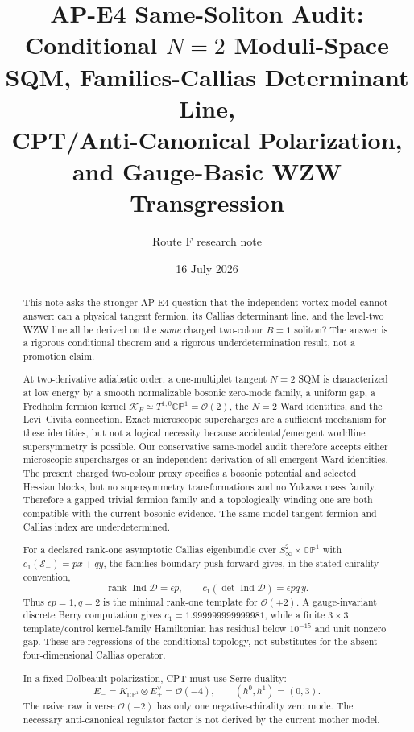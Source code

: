 \documentclass[11pt]{article}
\title{AP-E4 Same-Soliton Audit:\\
Conditional \(N=2\) Moduli-Space SQM, Families-Callias Determinant Line,\\
CPT/Anti-Canonical Polarization, and Gauge-Basic WZW Transgression}
\author{Route F research note}
\date{16 July 2026}
\theoremstyle{definition}
\theoremstyle{remark}
\newcommand{\CP}{\mathbb {CP}}
\newcommand{\cO}{\mathcal O}
\newcommand{\cK}{\mathcal K}
\newcommand{\cE}{\mathcal E}
\newcommand{\Ind}{\operatorname{Ind}}
\begin{document}
\maketitle

\begin{abstract}
This note asks the stronger AP-E4 question that the independent vortex model
cannot answer: can a physical tangent fermion, its Callias determinant line,
and the level-two WZW line all be derived on the \emph{same} charged
two-colour \(B=1\) soliton?  The answer is a rigorous conditional theorem and
a rigorous underdetermination result, not a promotion claim.

At two-derivative adiabatic order, a one-multiplet tangent \(N=2\) SQM is
characterized at low energy by a smooth normalizable bosonic zero-mode
family, a uniform gap, a Fredholm fermion kernel
\(\cK_F\simeq T^{1,0}\CP^1=\cO(2)\), the \(N=2\) Ward identities, and the
Levi--Civita connection.  Exact microscopic supercharges are a sufficient
mechanism for these identities, but not a logical necessity because
accidental/emergent worldline supersymmetry is possible.  Our conservative
same-model audit therefore accepts either microscopic supercharges or an
independent derivation of all emergent Ward identities.  The present charged
two-colour proxy specifies a bosonic potential and selected Hessian blocks,
but no supersymmetry transformations and no Yukawa mass family.  Therefore a
gapped trivial fermion family and a topologically winding one are both
compatible with the current bosonic evidence.  The same-model tangent
fermion and Callias index are underdetermined.

For a declared rank-one asymptotic Callias eigenbundle over
\(S^2_\infty\times\CP^1\) with
\(c_1(\cE_+)=p x+q y\), the families boundary push-forward gives, in the
stated chirality convention,
\[
 \operatorname{rank}\Ind\mathscr D=\epsilon p,
 \qquad
 c_1(\det\Ind\mathscr D)=\epsilon pq\,y.
\]
Thus \(\epsilon p=1,q=2\) is the minimal rank-one template for
\(\cO(+2)\).  A gauge-invariant discrete Berry computation gives
\(c_1=1.999999999999981\), while a finite \(3\times3\) template/control kernel-family
Hamiltonian has residual below \(10^{-15}\) and unit nonzero gap.  These are
regressions of the conditional topology, not substitutes for the absent
four-dimensional Callias operator.

In a fixed Dolbeault polarization, CPT must use Serre duality:
\[
 E_{-}=K_{\CP^1}\otimes E_+^\vee=\cO(-4),
 \qquad (h^0,h^1)=(0,3).
\]
The naive raw inverse \(\cO(-2)\) has only one negative-chirality zero mode.
The necessary anti-canonical regulator factor is not derived by the current
mother model.


\end{abstract}
\end{document}
